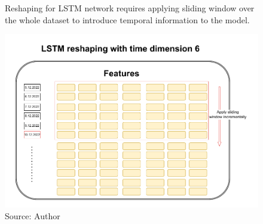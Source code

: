 \begin{figure}[!h]
    \centering
    \caption{Reshaping for LSTM network requires applying
    sliding window over the whole dataset to introduce temporal information
    to the model.}
    \includegraphics[width=1\textwidth]{Figures/LSTM_reshaping.drawio.pdf}
    \caption*{Source: Author}
    \label{fig:dataset_lstm_reshape}
\end{figure}